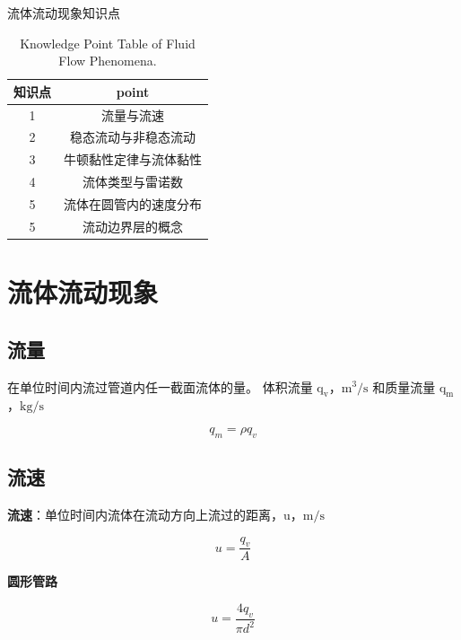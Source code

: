\documentclass{book}
\DeclareRobustCommand{\bluebold}[1]{\textbf{\textcolor[rgb]{0.31,0.63,0.86}{#1}}}
\begin{document}
\tableofcontents
\clearpage


流体流动现象知识点

\begin{table}[htbp]
\centering
\begin{tabular}{c c} 
\toprule
知识点 & point\\ [0.5ex] 
\midrule
 1 & 流量与流速 \\ 
 2 & 稳态流动与非稳态流动 \\
 3 & 牛顿黏性定律与流体黏性 \\
 4 & 流体类型与雷诺数 \\
 5 & 流体在圆管内的速度分布 \\ [1ex] 
 5 & 流动边界层的概念 \\ [1ex] 
\bottomrule
\end{tabular}
\caption{Knowledge Point Table of Fluid Flow Phenomena.}
\label{table:data}
\end{table}

\chapter{流体流动现象}

\section{流量}

在单位时间内流过管道内任一截面流体的量。
体积流量 $\mathrm{q_v}$，$\mathrm{m^3/s}$ 和质量流量 $\mathrm{q_m}$，$\mathrm{kg/s}$


\begin{equation}
q_m= \rho q_v
\end{equation}

\section{流速}

\bluebold{流速}：单位时间内流体在流动方向上流过的距离，u，$\mathrm{m/s}$

\begin{equation}
u = \frac{q_v}{A}
\end{equation}

\bluebold{圆形管路}

\begin{equation}
u = \frac{4 q_v}{\pi d^2}
\end{equation}
\end{document}
